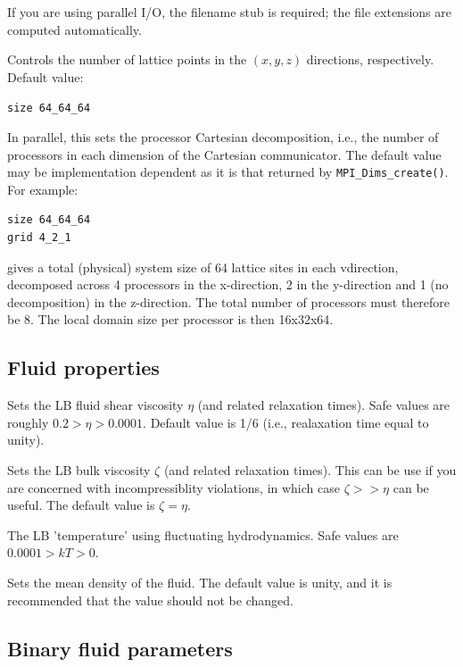 If you are using parallel I/O, the filename stub is required; the
file extensions are computed automatically.


Controls the number of lattice points in the $(x, y, z)$ directions,
respectively. Default value:

\texttt{size 64\_64\_64}


In parallel, this sets the processor Cartesian decomposition, i.e.,
the number of processors in each dimension of the Cartesian communicator.
The default value may be implementation dependent as it is that returned
by \texttt{MPI\_Dims\_create()}. For
example:
\begin{verbatim}
size 64_64_64
grid 4_2_1
\end{verbatim}
gives a total (physical) system size of 64 lattice sites in each
vdirection, decomposed across 4 processors in the x-direction, 2 in
the y-direction and 1 (no decomposition) in the z-direction. The
total number of processors must therefore be 8. The local domain
size per processor is then 16x32x64.


\subsection{Fluid properties}


Sets the LB fluid shear viscosity $\eta$ (and related relaxation times).
Safe values are roughly $0.2 > \eta > 0.0001 $. Default value is 1/6
(i.e., realaxation time equal to unity).


Sets the LB bulk viscosity $\zeta$ (and related relaxation times).
This can be use if you are concerned with incompressiblity
violations, in which case $\zeta >> \eta$ can be useful. The
default value is $\zeta = \eta$.


The LB 'temperature' using fluctuating hydrodynamics. Safe values
are $0.0001 > kT > 0$. 


Sets the mean density of the fluid. The default value is unity, and
it is recommended that the value should not be changed.


\subsection{Binary fluid parameters}

